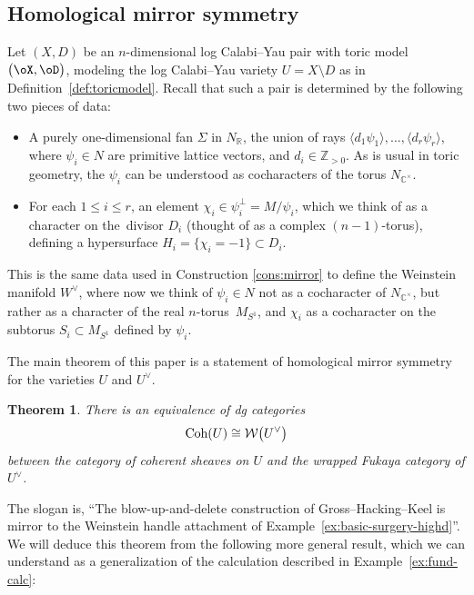 \documentclass[10pt,a4paper]{amsart}
\numberwithin{equation}{section}
\newtheorem{Theorem}{Theorem}[section]
\def\CC{\mathbb{C}}
\def\RR{\mathbb{R}}
\def\ZZ{\mathbb{Z}}
\def\cW{\mathcal{W}}
\newcommand{\Coh}{\textup{Coh}}
\begin{document}
 \subsection{Homological mirror symmetry}
Let $(X,D)$ be an $n$-dimensional log Calabi--Yau pair with toric model $\big(\oX,\oD\big)$, modeling the log Calabi--Yau variety $U=X\setminus D$ as in Definition~\ref{def:toricmodel}.
Recall that such a pair is determined by the following two pieces of data:
\begin{itemize}\itemsep=0pt
 \item A purely one-dimensional fan $\Sigma$ in $N_\RR$, the union of rays $\langle d_1\psi_1\rangle, \dots, \langle d_r\psi_r \rangle$, where $\psi_i\in N$ are primitive lattice vectors, and $d_i\in \ZZ_{>0}$. As is usual in toric geometry, the $\psi_i$ can be understood as cocharacters of the torus $N_{\CC^\times}$.
 \item For each $1\leq i\leq r$, an element $\chi_i\in \psi_i^\perp= M/\psi_i$, which we think of as a character on the~divisor $D_i$ (thought of as a complex $(n-1)$-torus), defining a hypersurface $H_i=\allowbreak\{\chi_i=-1\}\subset D_i$.
\end{itemize}
This is the same data used in Construction \ref{cons:mirror} to define the Weinstein manifold $W^\vee$, where now we think of $\psi_i\in N$ not as a cocharacter of $N_{\CC^\times}$, but rather as a character of the real $n$-torus~$M_{S^1}$, and $\chi_i$ as a cocharacter on the subtorus $S_i \subset M_{S^1}$ defined by $\psi_i$.

The main theorem of this paper is a statement of homological mirror symmetry for the varieties $U$ and $U^\vee$.


\begin{Theorem}\label{thm:main}
 There is an equivalence of dg categories
 \[
 	\Coh(U)\cong \cW\big(U^\vee\big)
 \]
 between the category of coherent sheaves on $U$ and the wrapped Fukaya category of $U^\vee$.
\end{Theorem}


The slogan is, ``The blow-up-and-delete construction of Gross--Hacking--Keel is mirror to the Weinstein handle attachment of Example~\ref{ex:basic-surgery-highd}''.
We will deduce this theorem from the following more general result, which we can understand as a generalization of the calculation described in Example~\ref{ex:fund-calc}:
\end{document}
